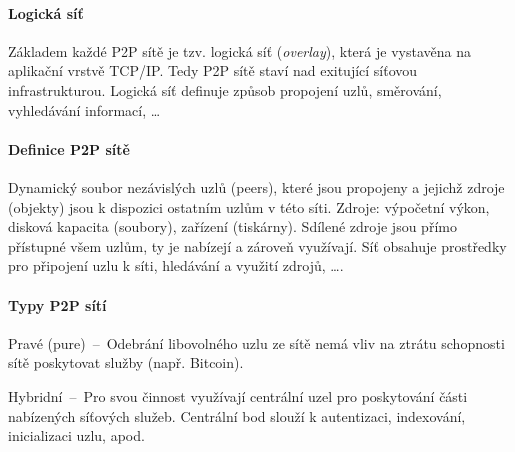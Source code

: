 \paragraph*{Logická síť} Základem každé P2P sítě je tzv. logická síť (\textit{overlay}), která je vystavěna na aplikační vrstvě TCP/IP. Tedy P2P sítě staví nad exitující síťovou infrastrukturou. Logická síť definuje způsob propojení uzlů, směrování, vyhledávání informací, \dots

\paragraph*{Definice P2P sítě} Dynamický soubor nezávislých uzlů (peers), které jsou propojeny a jejichž zdroje (objekty) jsou k dispozici ostatním uzlům v této síti. Zdroje: výpočetní výkon, disková kapacita (soubory), zařízení (tiskárny). Sdílené zdroje jsou přímo přístupné všem uzlům, ty je nabízejí a zároveň využívají. Síť obsahuje prostředky pro připojení uzlu k síti, hledávání a využití zdrojů, \dots.

\paragraph*{Typy P2P sítí} \begin{compactitem}
    \item Pravé (pure)~--~Odebrání libovolného uzlu ze sítě nemá vliv na ztrátu schopnosti sítě poskytovat služby (např. Bitcoin).
    \item Hybridní~--~Pro svou činnost využívají centrální uzel pro poskytování části nabízených síťových služeb. Centrální bod slouží k autentizaci, indexování, inicializaci uzlu, apod.
\end{compactitem}

